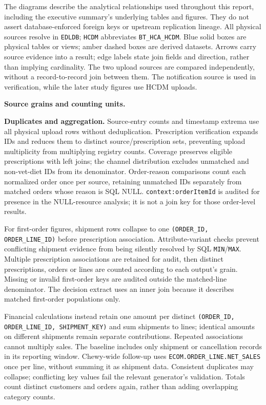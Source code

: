 \label{subsec:data-source-connections}
The diagrams describe the analytical relationships used throughout this report,
including the executive summary's underlying tables and figures. They do not
assert database-enforced foreign keys or upstream replication lineage. All
physical sources resolve in \texttt{EDLDB}; \texttt{HCDM} abbreviates
\texttt{BT\_HCA\_HCDM}. Blue solid boxes are physical tables or views; amber
dashed boxes are derived datasets. Arrows carry source evidence into a result;
edge labels state join fields and direction, rather than implying cardinality.
The two upload sources are compared independently, without a record-to-record
join between them. The notification source is used in verification, while
the later study figures use HCDM uploads.



\clearpage
\noindent\textbf{Source grains and counting units.}


\noindent\textbf{Duplicates and aggregation.}
Source-entry counts and timestamp extrema use all physical upload rows without
deduplication. Prescription verification expands IDs and reduces them to distinct
source/prescription sets, preventing upload multiplicity from multiplying registry
counts. Coverage preserves eligible prescriptions with left joins; the channel
distribution excludes unmatched and non-vet-diet IDs from its denominator.
Order-reason comparisons count each normalized order once per source, retaining
unmatched IDs separately from matched orders whose reason is SQL NULL.
\texttt{context:orderItemId} is audited for presence in the NULL-resource analysis;
it is not a join key for those order-level results.

For first-order figures, shipment rows collapse to one
\texttt{(ORDER\_ID, ORDER\_LINE\_ID)} before prescription association.
Attribute-variant checks prevent conflicting shipment evidence from being silently
resolved by SQL \texttt{MIN}/\texttt{MAX}. Multiple prescription associations
are retained for audit, then distinct prescriptions, orders or lines are counted
according to each output's grain. Missing or invalid first-order keys are audited
outside the matched-line denominator. The decision extract uses an inner join
because it describes matched first-order populations only.

Financial calculations instead retain one amount per distinct
\texttt{(ORDER\_ID, ORDER\_LINE\_ID, SHIPMENT\_KEY)} and sum shipments to lines;
identical amounts on different shipments remain separate contributions.
Repeated associations cannot multiply sales. The baseline includes only shipment
or cancellation records in its reporting window. Chewy-wide follow-up uses
\texttt{ECOM.ORDER\_LINE.NET\_SALES} once per line, without summing it as
shipment data. Consistent duplicates may collapse; conflicting key values fail
the relevant generator's validation. Totals count distinct customers and orders
again, rather than adding overlapping category counts.

